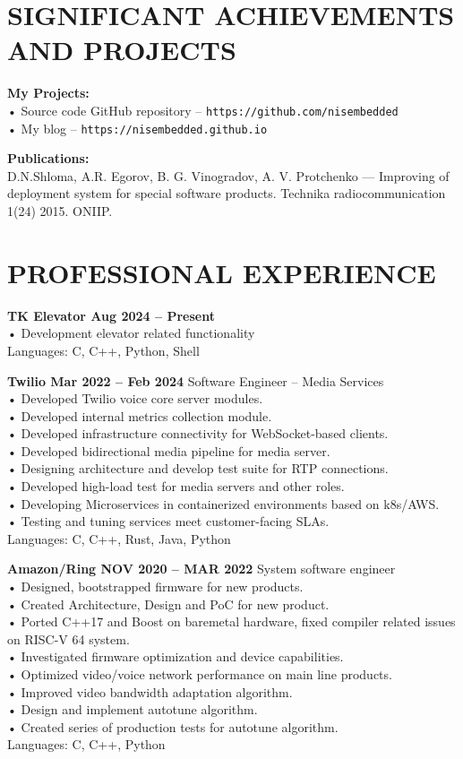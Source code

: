 \documentclass{article}
\begin{document}
\section{\textsf{SIGNIFICANT ACHIEVEMENTS AND PROJECTS}}

\textbf{My Projects:}\\
• Source code GitHub repository -- \texttt{https://github.com/nisembedded}\\
• My blog -- \texttt{https://nisembedded.github.io}

\bigskip\noindent
\textbf{Publications:}\\
D.N.Shloma, A.R. Egorov, B. G. Vinogradov, A. V. Protchenko — Improving of deployment
system for special software products. Technika radiocommunication 1(24) 2015. ONIIP.

\section{\textsf{PROFESSIONAL EXPERIENCE}}
\textbf{TK Elevator Aug 2024 -- Present}\\
• Development elevator related functionality\\
Languages: C, C++, Python, Shell

\bigskip\noindent
\textbf{Twilio Mar 2022 -- Feb 2024}
Software Engineer – Media Services\\
• Developed Twilio voice core server modules.\\
• Developed internal metrics collection module.\\
• Developed infrastructure connectivity for WebSocket-based clients.\\
• Developed bidirectional media pipeline for media server.\\
• Designing architecture and develop test suite for RTP connections.\\
• Developed high-load test for media servers and other roles.\\
• Developing Microservices in containerized environments based on k8s/AWS.\\
• Testing and tuning services meet customer-facing SLAs.\\
Languages: C, C++, Rust, Java, Python

\bigskip\noindent
\textbf{Amazon/Ring NOV 2020 -- MAR 2022}
System software engineer\\
• Designed, bootstrapped firmware for new products.\\
• Created Architecture, Design and PoC for new product.\\
• Ported C++17 and Boost on baremetal hardware, fixed compiler related issues on RISC-V 64 system.\\
• Investigated firmware optimization and device capabilities.\\
• Optimized video/voice network performance on main line products.\\
• Improved video bandwidth adaptation algorithm.\\
• Design and implement autotune algorithm.\\
• Created series of production tests for autotune algorithm.\\
Languages: C, C++, Python
\end{document}
